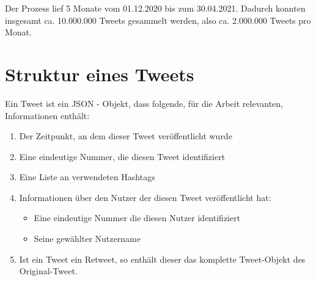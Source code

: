 Der Prozess lief 5 Monate vom 01.12.2020 bis zum 30.04.2021. 
Dadurch konnten insgesamt ca. 10.000.000 Tweets gesammelt werden, also ca. 2.000.000 Tweets pro Monat.

\section{Struktur eines Tweets}
Ein Tweet ist ein \ac{JSON} - Objekt, dass folgende, für die Arbeit relevanten, Informationen enthält:
\begin{enumerate}
	\item Der Zeitpunkt, an dem dieser Tweet veröffentlicht wurde
	\item Eine eindeutige Nummer, die diesen Tweet identifiziert
	\item Eine Liste an verwendeten \glspl{Hashtag}
	\item Informationen über den Nutzer der diesen Tweet veröffentlicht hat: 
	\begin{itemize}
		\item Eine eindeutige Nummer die diesen Nutzer identifiziert
		\item Seine gewählter Nutzername
	\end{itemize}
	\item Ist ein Tweet ein \gls{Retweet}, so enthält dieser das komplette Tweet-Objekt des Original-Tweet.
\end{enumerate}



 